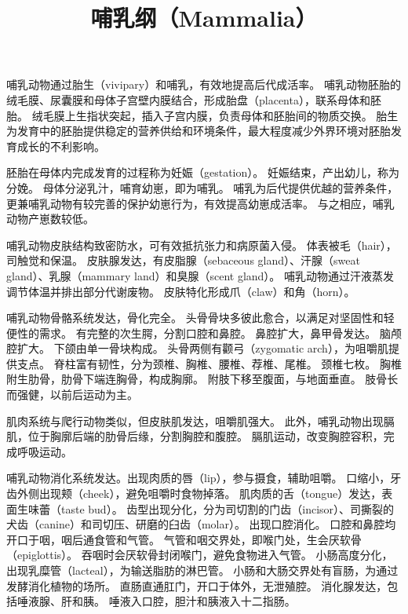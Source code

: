 \documentclass[11pt]{article}
\title{哺乳纲（Mammalia）}
\date{}
\begin{document}
  \maketitle

  \linenumbers
哺乳动物通过胎生（vivipary）和哺乳，有效地提高后代成活率。
哺乳动物胚胎的绒毛膜、尿囊膜和母体子宫壁内膜结合，形成胎盘（placenta），联系母体和胚胎。
绒毛膜上生指状突起，插入子宫内膜，负责母体和胚胎间的物质交换。
胎生为发育中的胚胎提供稳定的营养供给和环境条件，最大程度减少外界环境对胚胎发育成长的不利影响。

\newline

胚胎在母体内完成发育的过程称为妊娠（gestation）。
妊娠结束，产出幼儿，称为分娩。
母体分泌乳汁，哺育幼崽，即为哺乳。
哺乳为后代提供优越的营养条件，更兼哺乳动物有较完善的保护幼崽行为，有效提高幼崽成活率。
与之相应，哺乳动物产崽数较低。

\newline

哺乳动物皮肤结构致密防水，可有效抵抗张力和病原菌入侵。
体表被毛（hair），司触觉和保温。
皮肤腺发达，有皮脂腺（sebaceous gland）、汗腺（sweat gland）、乳腺（mammary land）和臭腺（scent gland）。
哺乳动物通过汗液蒸发调节体温并排出部分代谢废物。
皮肤特化形成爪（claw）和角（horn）。

\newline

哺乳动物骨骼系统发达，骨化完全。
头骨骨块多彼此愈合，以满足对坚固性和轻便性的需求。
有完整的次生腭，分割口腔和鼻腔。
鼻腔扩大，鼻甲骨发达。
脑颅腔扩大。
下颌由单一骨块构成。
头骨两侧有颧弓（zygomatic arch），为咀嚼肌提供支点。
脊柱富有韧性，分为颈椎、胸椎、腰椎、荐椎、尾椎。
颈椎七枚。
胸椎附生肋骨，肋骨下端连胸骨，构成胸廓。
附肢下移至腹面，与地面垂直。
肢骨长而强健，以前后运动为主。

\newline

肌肉系统与爬行动物类似，但皮肤肌发达，咀嚼肌强大。
此外，哺乳动物出现膈肌，位于胸廓后端的肋骨后缘，分割胸腔和腹腔。
膈肌运动，改变胸腔容积，完成呼吸运动。

\newline

哺乳动物消化系统发达。出现肉质的唇（lip），参与摄食，辅助咀嚼。
口缩小，牙齿外侧出现颊（cheek），避免咀嚼时食物掉落。
肌肉质的舌（tongue）发达，表面生味蕾（taste bud）。
齿型出现分化，分为司切割的门齿（incisor）、司撕裂的犬齿（canine）和司切压、研磨的臼齿（molar）。
出现口腔消化。
口腔和鼻腔均开口于咽，咽后通食管和气管。
气管和咽交界处，即喉门处，生会厌软骨（epiglottis）。
吞咽时会厌软骨封闭喉门，避免食物进入气管。
小肠高度分化，出现乳糜管（lacteal），为输送脂肪的淋巴管。
小肠和大肠交界处有盲肠，为通过发酵消化植物的场所。
直肠直通肛门，开口于体外，无泄殖腔。
消化腺发达，包括唾液腺、肝和胰。
唾液入口腔，胆汁和胰液入十二指肠。
\end{document}
